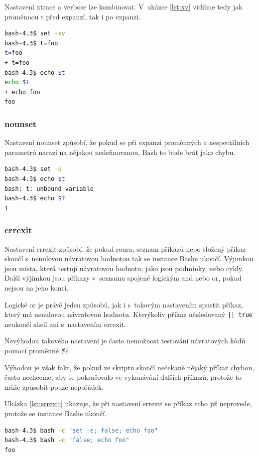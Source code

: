 \documentclass[thesis=M,czech]{FITthesis}[2012/06/26]
\begin{document}
Nastavení xtrace a verbose lze kombinovat. V~ukázce \ref{lst:xv} vidiíme tedy jak proměnnou t před expanzí, tak i po expanzi.

\begin{lstlisting}[language=bash, caption={Výstup z~knihovny Bashlex}, label={lst:xv}]
bash-4.3$ set -xv
bash-4.3$ t=foo
t=foo
+ t=foo
bash-4.3$ echo $t
echo $t
+ echo foo
foo
\end{lstlisting}


\subsubsection{nounset}

Nastavení nounset způsobí, že pokud se při expanzi proměnných a nespeciálních parametrů narazí na nějakou nedefinovanou, Bash to bude brát jako chybu.

\begin{lstlisting}[language=bash, caption={nounset}, label={lst:unbound}]
bash-4.3$ set -u
bash-4.3$ echo $t
bash: t: unbound variable
bash-4.3$ echo $?
1
\end{lstlisting}


\subsubsection{errexit}

Nastavení errexit způsobí, že pokud roura, seznam příkazů nebo složený příkaz skončí s~nenulovou návratovou hodnotou tak se instance Bashe ukončí. Výjimkou jsou místa, která testují návratovou hodnotu, jako jsou podmínky, nebo cykly. Další výjimkou jsou příkazy v~seznamu spojené logickým and nebo or, pokud nejsou na jeho konci.

Logické or je právě jeden způsobů, jak i s~takovým nastavením spustit příkaz, který má nenulovou návratovou hodnotu. Kterýkoliv příkaz následovaný \texttt{|| true} neukončí shell ani s~nastavením errexit.

Nevýhodou takového nastavení je často nemožnost testování návratových kódů pomocí proměnné \textit{\$?}.

Výhodou je však fakt, že pokud ve skriptu skončí nečekaně nějaký příkaz chybou, často nechceme, aby se pokračovalo ve vykonávání dalších příkazů, protože to může způsobit pouze nepořádek.

Ukázka \ref{lst:errexit} ukazuje, že při nastavení errexit se příkaz echo již neprovede, protože se instance Bashe ukončí.

\begin{lstlisting}[language=bash, caption={errexit}, label={lst:errexit}]
bash-4.3$ bash -c "set -e; false; echo foo"
bash-4.3$ bash -c "false; echo foo"
foo
\end{lstlisting}
\end{document}
